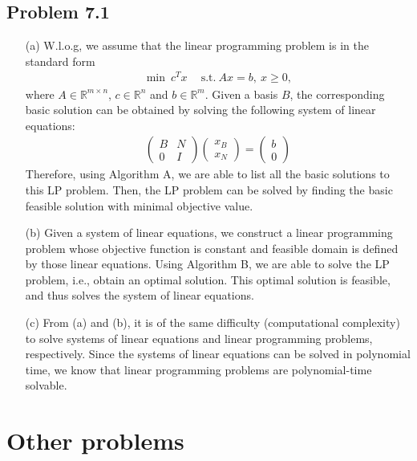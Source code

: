 \documentclass[11pt]{article}
\begin{document}
\subsection*{Problem 7.1}
\begin{itemize}
	\item[(a)] W.l.o.g, we assume that the linear programming problem is in the standard form \begin{align*}
	\min ~c^Tx~\quad\text{s.t.} ~Ax=b, ~x\geq 0,
	\end{align*}where $A\in\mathbb{R}^{m\times n}$, $c\in\mathbb{R}^n$ and $b\in\mathbb{R}^m$. Given a basis $B$, the corresponding basic solution can be obtained by solving the following system of linear equations: 
	\begin{align*}
	\left( \begin{array}{ll} B & N \\ 0 & I \end{array}\right) \left( \begin{array}{l}x_B\\x_N\end{array}\right) =\left( \begin{array}{l}b\\0\end{array}\right)
	\end{align*}
	Therefore, using Algorithm A, we are able to list all the basic solutions to this LP problem. Then, the LP problem can be solved by finding the basic feasible solution with minimal objective value.
	
	\item[(b)] Given a system of linear equations, we construct a linear programming problem whose objective function is constant and feasible domain is defined by those linear equations. Using Algorithm B, we are able to solve the LP problem, i.e., obtain an optimal solution. This optimal solution is feasible, and thus solves the system of linear equations. 
	\item[(c)] From (a) and (b), it is of the same difficulty (computational complexity) to solve systems of linear equations and linear programming problems, respectively. Since the systems of linear equations can be solved in polynomial time, we know that linear programming problems are polynomial-time solvable. 
\end{itemize}

\section*{Other problems}
\end{document}
